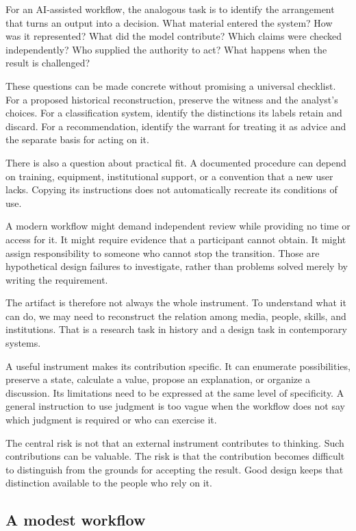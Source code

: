 \documentclass[11pt]{article}
\begin{document}
For an AI-assisted workflow, the analogous task is to identify the arrangement
that turns an output into a decision. What material entered the system?
How was it represented? What did the model contribute? Which claims were
checked independently? Who supplied the authority to act? What happens
when the result is challenged?

These questions can be made concrete without promising a universal checklist.
For a proposed historical reconstruction, preserve the witness and the
analyst's choices. For a classification system, identify the distinctions
its labels retain and discard. For a recommendation, identify the warrant
for treating it as advice and the separate basis for acting on it.

There is also a question about practical fit. A documented procedure can
depend on training, equipment, institutional support, or a convention that
a new user lacks. Copying its instructions does not automatically recreate
its conditions of use.

A modern workflow might demand independent review while providing no time
or access for it. It might require evidence that a participant cannot obtain.
It might assign responsibility to someone who cannot stop the transition.
Those are hypothetical design failures to investigate, rather than problems
solved merely by writing the requirement.

The artifact is therefore not always the whole instrument. To understand
what it can do, we may need to reconstruct the relation among media,
people, skills, and institutions. That is a research task in history and
a design task in contemporary systems.

A useful instrument makes its contribution specific. It can enumerate
possibilities, preserve a state, calculate a value, propose an explanation,
or organize a discussion. Its limitations need to be expressed at the
same level of specificity. A general instruction to use judgment is too vague
when the workflow does not say which judgment is required or who can exercise it.

The central risk is not that an external instrument contributes to thinking.
Such contributions can be valuable. The risk is that the contribution becomes
difficult to distinguish from the grounds for accepting the result.
Good design keeps that distinction available to the people who rely on it.

\subsection{A modest workflow}
\end{document}
